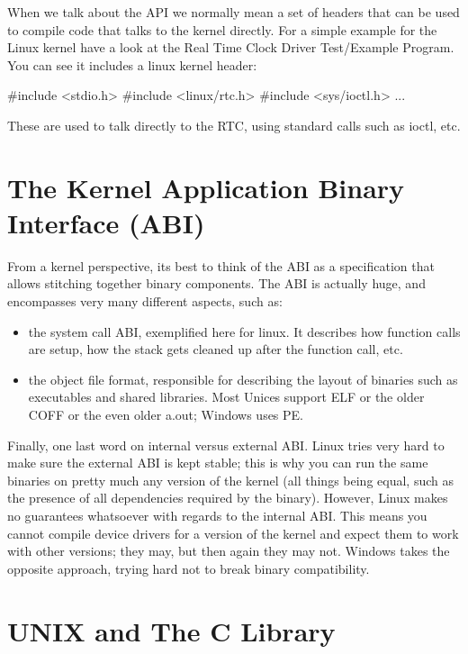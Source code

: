 \documentclass{book}
\begin{document}
When we talk about the API we normally mean a set of headers that can
be used to compile code that talks to the kernel directly. For a
simple example for the Linux kernel have a look at the Real Time Clock
Driver Test/Example Program. You can see it includes a linux kernel
header:

\begin{pseudocode}[backgroundcolor=\color{lightgray}]
#include <stdio.h>
#include <linux/rtc.h>
#include <sys/ioctl.h>
...
\end{pseudocode}

These are used to talk directly to the RTC, using standard calls such
as ioctl, etc.

\section{The Kernel Application Binary Interface (ABI)}

From a kernel perspective, its best to think of the ABI as a
specification that allows stitching together binary components. The
ABI is actually huge, and encompasses very many different aspects,
such as:

\begin{itemize}
\item the system call ABI, exemplified here for linux. It describes
  how function calls are setup, how the stack gets cleaned up after
  the function call, etc.
\item the object file format, responsible for describing the layout of
  binaries such as executables and shared libraries. Most Unices
  support ELF or the older COFF or the even older a.out; Windows uses
  PE.
\end{itemize}

Finally, one last word on internal versus external ABI. Linux tries
very hard to make sure the external ABI is kept stable; this is why
you can run the same binaries on pretty much any version of the kernel
(all things being equal, such as the presence of all dependencies
required by the binary). However, Linux makes no guarantees whatsoever
with regards to the internal ABI. This means you cannot compile device
drivers for a version of the kernel and expect them to work with other
versions; they may, but then again they may not. Windows takes the
opposite approach, trying hard not to break binary compatibility.

\section{UNIX and The C Library}
\end{document}
